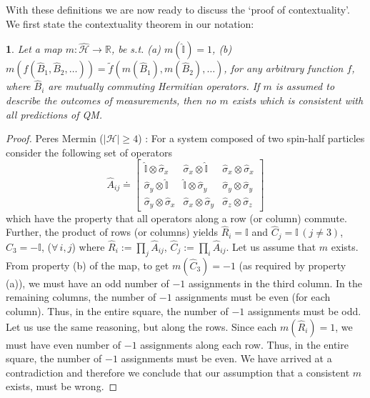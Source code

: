 \documentclass[british,aps,prl,superscriptaddress,nofootinbib,times,reprint]{revtex4-1}
\theoremstyle{plain}
\newtheorem{thm}{\protect\theoremname}
\theoremstyle{definition}
\theoremstyle{remark}
\theoremstyle{remark}
\theoremstyle{remark}
\theoremstyle{plain}
\theoremstyle{plain}
\theoremstyle{plain}
\theoremstyle{definition}
\theoremstyle{definition}
\providecommand{\theoremname}{Theorem}
\begin{document}
With these definitions we are now ready to discuss
the `proof of contextuality'. We first state the
contextuality theorem in our notation:
\begin{thm} Let a map
$m:\hat{\mathcal{H}}\to\mathbb{R}$, be s.t. (a)
$m(\hat{\mathbb{I}})=1$, (b)
$m(f(\hat{B}_{1},\hat{B}_{2},\dots))=\tilde
f(m(\hat{B}_{1}),m(\hat{B}_{2}),\dots)$, for any
arbitrary function $f$, where $\hat{B}_{i}$ are
mutually commuting Hermitian operators. If $m$ is
assumed to describe the outcomes of measurements,
then no $m$ exists which is consistent with all
predictions of QM. 
\label{thm:KS}
\end{thm}

\begin{proof} Peres Mermin
($\left|\mathcal{H}\right|\ge4$)
\cite{Peres,Mermin}:
For a system composed of two spin-half particles 
consider the following set of operators \[
\hat{A}_{ij}\doteq\left[\begin{array}{ccc}
\hat{\mathbb{I}}\otimes\hat{\sigma}_{x} &
\hat{\sigma}_{x}\otimes\hat{\mathbb{I}} &
\hat{\sigma}_{x}\otimes\hat{\sigma}_{x}\\
\hat{\sigma}_{y}\otimes\hat{\mathbb{I}} &
\hat{\mathbb{I}}\otimes\hat{\sigma}_{y} &
\hat{\sigma}_{y}\otimes\hat{\sigma}_{y}\\
\hat{\sigma}_{y}\otimes\hat{\sigma}_{x} &
\hat{\sigma}_{x}\otimes\hat{\sigma}_{y} &
\hat{\sigma}_{z}\otimes\hat{\sigma}_{z}
\end{array}\right] \] which have the property that
all operators along a row (or column) commute. Further,
the product of rows (or columns) yields
$\hat{R}_{i}=\mathbb{I}$ and
$\hat{C}_{j}=\mathbb{I}\,(j\neq3)$,
$\hat{C}_{3}=-\mathbb{I}$, ($\forall\,i,j$) where
$\hat{R}_{i}:=\prod_{j}\hat{A}_{ij}$,
$\hat{C}_{j}:=\prod_{i}\hat{A}_{ij}$. Let us
assume that $m$ exists. From property (b) of the
map, to get $m(\hat{C}_{3})=-1$ (as required by
property (a)), we must have an odd number of $-1$
assignments in the third column. In the remaining
columns, the number of $-1$ assignments must be
even (for each column). Thus, in the entire
square, the number of $-1$ assignments must be
odd. Let us use the same reasoning, but along the
rows. Since each $m(\hat{R}_{i})=1$, we must have
even number of $-1$ assignments along each row.
Thus, in the entire square, the number of $-1$
assignments must be even. We have arrived at a
contradiction and therefore we conclude that our
assumption that a consistent $m$ exists, must be
wrong.  \end{proof}
\end{document}
